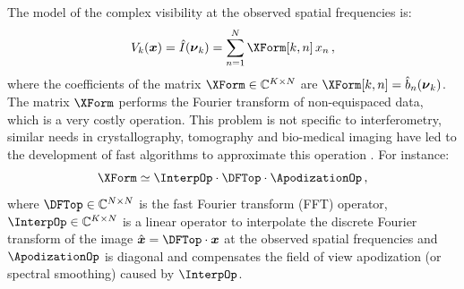 \documentclass{article}
\newcommand{\V}[1]{\boldsymbol{#1}}      %
\newcommand{\FT}[1]{\hat{#1}}            %
\newcommand{\Complexes}{\mathbb{C}}
\newcommand{\ComplexVis}{V}
\newcommand{\Freq}{\nu}               %
\newcommand{\VFreq}{\V{\Freq}}
\newcommand{\Image}{I}
\newcommand{\Param}{x}
\newcommand{\VParam}{\V{\Param}}
\newcommand{\BasisFunc}{b}
\begin{document}
The model of the complex visibility at the observed spatial frequencies is:
\begin{equation}
  \label{eq:sampled-image-FT}
  \ComplexVis_{k}(\VParam) = \FT{\Image}(\VFreq_k)
  = \sum_{n=1}^{N} \XForm[k,n] \, \Param_{n}
  \,,
\end{equation}
where the coefficients of the matrix $\XForm\in\Complexes^{K\times{}N}$ are
$\XForm[k,n] = \FT{\BasisFunc}_n(\VFreq_k)$.  The matrix $\XForm$ performs the
Fourier transform of non-equispaced data, which is a very costly operation.
This problem is not specific to interferometry, similar needs in
crystallography, tomography and bio-medical imaging have led to the
development of fast algorithms to approximate this operation
\citep{Potts_et_al-2001-NFFT_tutorial}.  For instance:
\begin{equation}
  \label{eq:Fourier-approximation}
  \XForm \simeq \InterpOp\cdot\DFTop\cdot\ApodizationOp \, ,
\end{equation}
where $\DFTop\in\Complexes^{N\times{}N}$ is the fast Fourier transform (FFT)
operator, $\InterpOp\in\Complexes^{K\times{}N}$ is a linear operator to
interpolate the discrete Fourier transform of the image
$\FT{\VParam}=\DFTop\cdot\VParam$ at the observed spatial frequencies and
$\ApodizationOp$ is diagonal and compensates the field of view apodization (or
spectral smoothing) caused by $\InterpOp$.

\end{document}
